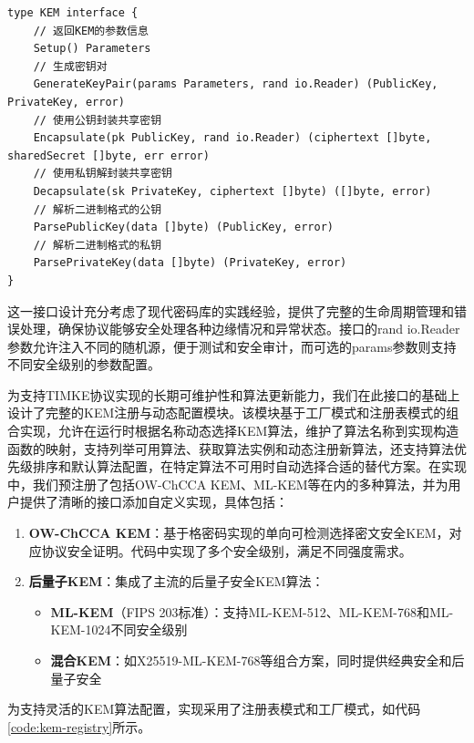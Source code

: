 \begin{listing}[ht]
\begin{verbatim}
type KEM interface {
    // 返回KEM的参数信息
    Setup() Parameters
    // 生成密钥对
    GenerateKeyPair(params Parameters, rand io.Reader) (PublicKey, PrivateKey, error)
    // 使用公钥封装共享密钥
    Encapsulate(pk PublicKey, rand io.Reader) (ciphertext []byte, sharedSecret []byte, err error)
    // 使用私钥解封装共享密钥
    Decapsulate(sk PrivateKey, ciphertext []byte) ([]byte, error)
    // 解析二进制格式的公钥
    ParsePublicKey(data []byte) (PublicKey, error)
    // 解析二进制格式的私钥
    ParsePrivateKey(data []byte) (PrivateKey, error)
}
\end{verbatim}
\caption{KEM接口定义}
\label{code:kem-interface}
\end{listing}

这一接口设计充分考虑了现代密码库的实践经验，提供了完整的生命周期管理和错误处理，确保协议能够安全处理各种边缘情况和异常状态。接口的rand io.Reader参数允许注入不同的随机源，便于测试和安全审计，而可选的params参数则支持不同安全级别的参数配置。

为支持TIMKE协议实现的长期可维护性和算法更新能力，我们在此接口的基础上设计了完整的KEM注册与动态配置模块。该模块基于工厂模式和注册表模式的组合实现，允许在运行时根据名称动态选择KEM算法，维护了算法名称到实现构造函数的映射，支持列举可用算法、获取算法实例和动态注册新算法，还支持算法优先级排序和默认算法配置，在特定算法不可用时自动选择合适的替代方案。在实现中，我们预注册了包括OW-ChCCA KEM、ML-KEM等在内的多种算法，并为用户提供了清晰的接口添加自定义实现，具体包括：

\begin{enumerate}
    \item \textbf{OW-ChCCA KEM}：基于格密码实现的单向可检测选择密文安全KEM，对应协议安全证明。代码中实现了多个安全级别，满足不同强度需求。
    
    \item \textbf{后量子KEM}：集成了主流的后量子安全KEM算法：
    \begin{itemize}
        \item \textbf{ML-KEM}（FIPS 203标准）：支持ML-KEM-512、ML-KEM-768和ML-KEM-1024不同安全级别
        \item \textbf{混合KEM}：如X25519-ML-KEM-768等组合方案，同时提供经典安全和后量子安全
    \end{itemize}
\end{enumerate}

为支持灵活的KEM算法配置，实现采用了注册表模式和工厂模式，如代码\ref{code:kem-registry}所示。

